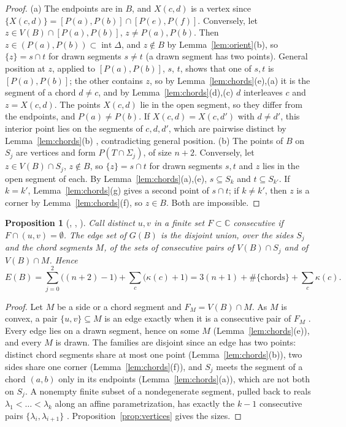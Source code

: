 \documentclass[11pt]{amsart}
\theoremstyle{plain}
\newtheorem{proposition}[theorem]{Proposition}
\theoremstyle{definition}
\newcommand{\C}{\mathbb{C}}
\newcommand{\inter}{\operatorname{int}}
\newcommand{\lean}[1]{{\upshape[#1]}}
\begin{document}
\begin{proof}
(a) The endpoints are in $B$, and $X(c,d)$ is a vertex since $\{X(c,d)\}=[P(a),P(b)]\cap[P(e),P(f)]$. Conversely, let $z\in V(B)\cap[P(a),P(b)]$, $z\ne P(a),P(b)$. Then $z\in(P(a),P(b))\subset\inter\Delta$, and $z\notin B$ by Lemma~\ref{lem:orient}(b), so $\{z\}=s\cap t$ for drawn segments $s\ne t$ (a drawn segment has two points). General position at $z$, applied to $[P(a),P(b)]$, $s$, $t$, shows that one of $s,t$ is $[P(a),P(b)]$; the other contains $z$, so by Lemma~\ref{lem:chords}(e),(a) it is the segment of a chord $d\ne c$, and by Lemma~\ref{lem:chords}(d),(c) $d$ interleaves $c$ and $z=X(c,d)$.
The points $X(c,d)$ lie in the open segment, so they differ from the endpoints, and $P(a)\ne P(b)$. If $X(c,d)=X(c,d')$ with $d\ne d'$, this interior point lies on the segments of $c,d,d'$, which are pairwise distinct by Lemma~\ref{lem:chords}(b) \lean{\decl{seg_ne}}, contradicting general position.
(b) The points of $B$ on $S_j$ are vertices and form $P(T\cap\Sigma_j)$, of size $n+2$. Conversely, let $z\in V(B)\cap S_j$, $z\notin B$, so $\{z\}=s\cap t$ for drawn segments $s,t$ and $z$ lies in the open segment of each. By Lemma~\ref{lem:chords}(a),(e), $s\subseteq S_k$ and $t\subseteq S_{k'}$. If $k=k'$, Lemma~\ref{lem:chords}(g) gives a second point of $s\cap t$; if $k\ne k'$, then $z$ is a corner by Lemma~\ref{lem:chords}(f), so $z\in B$. Both are impossible.
\end{proof}

\begin{proposition}[, , ]\label{prop:edges}
Call distinct $u,v$ in a finite set $F\subset\C$ \emph{consecutive} if $F\cap(u,v)=\emptyset$. The edge set of $G(B)$ is the disjoint union, over the sides $S_j$ and the chord segments $M$, of the sets of consecutive pairs of $V(B)\cap S_j$ and of $V(B)\cap M$. Hence
\[
E(B)=\sum_{j=0}^2\bigl((n+2)-1\bigr)+\sum_{c}\bigl(\kappa(c)+1\bigr)=3(n+1)+\#\{\text{chords}\}+\sum_c\kappa(c).
\]
\end{proposition}

\begin{proof}
Let $M$ be a side or a chord segment and $F_M=V(B)\cap M$. As $M$ is convex, a pair $\{u,v\}\subseteq M$ is an edge exactly when it is a consecutive pair of $F_M$ \lean{\decl{consF_iff}}. Every edge lies on a drawn segment, hence on some $M$ (Lemma~\ref{lem:chords}(e)), and every $M$ is drawn. The families are disjoint since an edge has two points: distinct chord segments share at most one point (Lemma~\ref{lem:chords}(b)), two sides share one corner (Lemma~\ref{lem:chords}(f)), and $S_j$ meets the segment of a chord $(a,b)$ only in its endpoints (Lemma~\ref{lem:chords}(a)), which are not both on $S_j$. A nonempty finite subset of a nondegenerate segment, pulled back to reals $\lambda_1<\dots<\lambda_k$ along an affine parametrization, has exactly the $k-1$ consecutive pairs $\{\lambda_i,\lambda_{i+1}\}$ \lean{\decl{consF_card}, \decl{consR_card}}. Proposition~\ref{prop:vertices} gives the sizes.
\end{proof}
\end{document}

